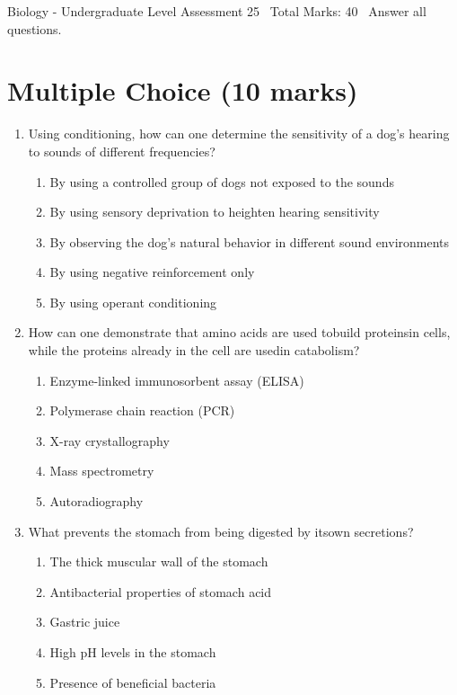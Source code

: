 \documentclass[12pt]{article}
\begin{document}
\begin{center}
Biology - Undergraduate Level Assessment 25 \
Total Marks: 40 \
Answer all questions.
\end{center}

\section*{Multiple Choice (10 marks)}
\begin{enumerate}[label=\arabic*.]
\item Using conditioning, how can one determine the sensitivity of a dog's hearing to sounds of different frequencies?
\begin{enumerate}[label=(\alph*)]
    \item By using a controlled group of dogs not exposed to the sounds
    \item By using sensory deprivation to heighten hearing sensitivity
    \item By observing the dog's natural behavior in different sound environments
    \item By using negative reinforcement only
    \item By using operant conditioning
\end{enumerate}
\item How can one demonstrate that amino acids are used tobuild proteinsin cells, while the proteins already in the cell are usedin catabolism?
\begin{enumerate}[label=(\alph*)]
    \item Enzyme-linked immunosorbent assay (ELISA)
    \item Polymerase chain reaction (PCR)
    \item X-ray crystallography
    \item Mass spectrometry
    \item Autoradiography
\end{enumerate}
\item What prevents the stomach from being digested by itsown secretions?
\begin{enumerate}[label=(\alph*)]
    \item The thick muscular wall of the stomach
    \item Antibacterial properties of stomach acid
    \item Gastric juice
    \item High pH levels in the stomach
    \item Presence of beneficial bacteria
\end{enumerate}

\end{enumerate}
\end{document}
